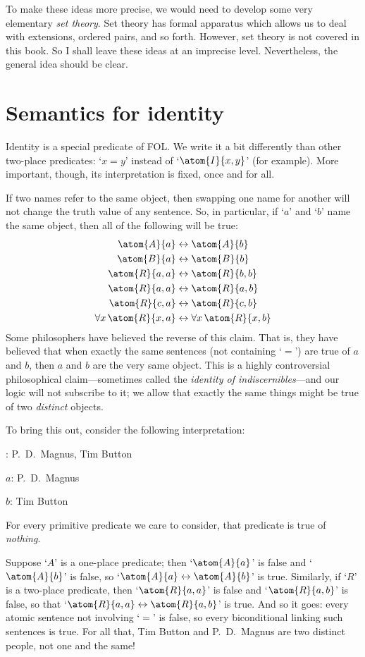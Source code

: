 To make these ideas more precise, we would need to develop some very elementary \emph{set theory}. Set theory has formal apparatus which allows us to deal with extensions, ordered pairs, and so forth. However, set theory is not covered in this book. So I shall leave these ideas at an imprecise level. Nevertheless, the general idea should be clear.


\section{Semantics for identity}
Identity is a special predicate of FOL. We write it a bit differently than other two-place predicates: `$x=y$' instead of `$\atom{I}{x,y}$' (for example). More important, though, its interpretation is fixed, once and for all.

If two names refer to the same object, then swapping one name for another will not change the truth value of any sentence. So, in particular, if `$a$' and `$b$' name the same object, then all of the following will be true:\label{model.nonidentity}
	\begin{align*}
	 	\atom{A}{a} &\eiff \atom{A}{b} \\
	 	\atom{B}{a} &\eiff \atom{B}{b}\\
		\atom{R}{a,a} &\eiff \atom{R}{b,b}\\
		\atom{R}{a,a} & \eiff \atom{R}{a,b}\\
		\atom{R}{c,a} &\eiff \atom{R}{c,b}\\
		\forall x\, \atom{R}{x,a} &\eiff \forall x\, \atom{R}{x,b}
	\end{align*}
Some philosophers have believed the reverse of this claim. That is, they have believed that when exactly the same sentences (not containing `$=$') are true of $a$ and $b$, then $a$ and $b$ are the very same object. This is a highly controversial philosophical claim---sometimes called the \emph{identity of indiscernibles}---and our logic will not subscribe to it; we allow that exactly the same things might be true of two \emph{distinct} objects.  

To bring this out, consider the following interpretation:
	\begin{ebullet}
		\item[\text{domain}:] P.~D.\ Magnus, Tim Button
		\item[$a$:] P.~D.\ Magnus
		\item[$b$:] Tim Button
		\item For every primitive predicate we care to consider, that predicate is true of \emph{nothing}.
	\end{ebullet}
Suppose `$A$' is a one-place predicate; then `$\atom{A}{a}$' is false and `$\atom{A}{b}$' is false, so `$\atom{A}{a} \eiff \atom{A}{b}$' is true. Similarly, if `$R$' is a two-place predicate, then `$\atom{R}{a,a}$' is false and `$\atom{R}{a,b}$' is false, so that `$\atom{R}{a,a} \eiff \atom{R}{a,b}$' is true. And so it goes: every atomic sentence not involving `$=$' is false, so every biconditional linking such sentences is true. For all that, Tim Button and P.~D.\ Magnus are two distinct people, not one and the same!

